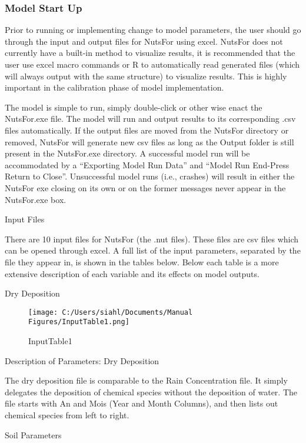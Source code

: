 \documentclass[
]{article}
\begin{document}
\hypertarget{model-start-up}{%
\subsubsection{Model Start Up}\label{model-start-up}}

Prior to running or implementing change to model parameters, the user
should go through the input and output files for NutsFor using excel.
NutsFor does not currently have a built-in method to visualize results,
it is recommended that the user use excel macro commands or R to
automatically read generated files (which will always output with the
same structure) to visualize results. This is highly important in the
calibration phase of model implementation.

The model is simple to run, simply double-click or other wise enact the
NutsFor.exe file. The model will run and output results to its
corresponding .csv files automatically. If the output files are moved
from the NutsFor directory or removed, NutsFor will generate new csv
files as long as the Output folder is still present in the NutsFor.exe
directory. A successful model run will be accommodated by a ``Exporting
Model Run Data'' and ``Model Run End-Press Return to Close''.
Unsuccessful model runs (i.e., crashes) will result in either the
NutsFor exe closing on its own or on the former messages never appear in
the NutsFor.exe box.

Input Files

There are 10 input files for NutsFor (the .nut files). These files are
csv files which can be opened through excel. A full list of the input
parameters, separated by the file they appear in, is shown in the tables
below. Below each table is a more extensive description of each variable
and its effects on model outputs.

Dry Deposition

\begin{figure}
\centering
\texttt{[image: C:/Users/siahl/Documents/Manual Figures/InputTable1.png]}
\caption{InputTable1}
\end{figure}

Description of Parameters: Dry Deposition

The dry deposition file is comparable to the Rain Concentration file. It
simply delegates the deposition of chemical species without the
deposition of water. The file starts with An and Mois (Year and Month
Columns), and then lists out chemical species from left to right.

Soil Parameters
\end{document}
